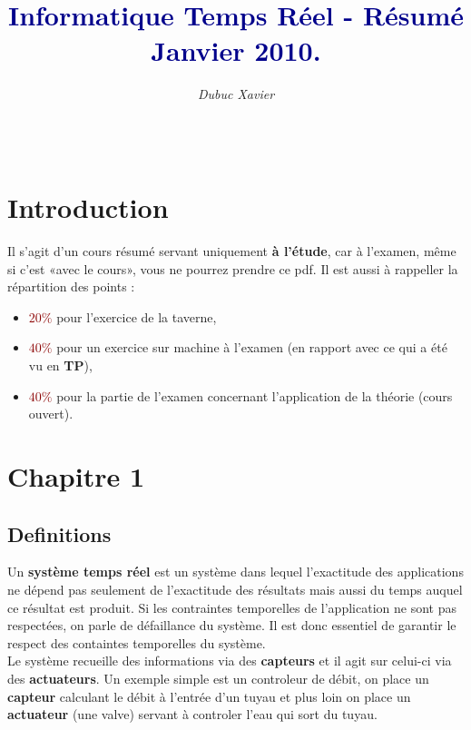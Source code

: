 \documentclass{article}
\title{\textbf{\textcolor{darkblue}{Informatique Temps Réel - Résumé Janvier 2010.}}}
\author{\textit{Dubuc Xavier}}
\newcommand{\dred}[1]{\textcolor{darkred}{\textbf{#1}}}
\begin{document}
\maketitle

\hbox{\raisebox{0.4em}{\vrule depth 0.4pt height 0.4pt width 10cm}}

\tableofcontents

$ $ \\
\hbox{\raisebox{0.4em}{\vrule depth 0.4pt height 0.4pt width 10cm}}

\newpage

\section*{Introduction}

Il s'agit d'un cours résumé servant uniquement \textbf{à l'étude}, car à l'examen, même si c'est «avec le 
cours», vous ne pourrez prendre ce pdf. Il est aussi à rappeller la répartition des points : \\
\begin{itemize}
\item \dred{$20\%$} pour l'exercice de la taverne,
\item \dred{$40\%$} pour un exercice sur machine à l'examen (en rapport avec ce qui a été vu en 
\textbf{TP}),
\item \dred{$40\%$} pour la partie de l'examen concernant l'application de la théorie (cours ouvert).
\end{itemize}

\section{Chapitre 1}

\subsection{Definitions}

Un \textbf{système temps réel} est un système dans lequel l'exactitude des applications ne dépend pas 
seulement de l'exactitude des résultats mais aussi du temps auquel ce résultat est produit. Si les 
contraintes temporelles de l'application ne sont pas respectées, on parle de défaillance du système. Il est 
donc essentiel de garantir le respect des containtes temporelles du système. \\

Le système recueille des informations via des \textbf{capteurs} et il agit sur celui-ci via des 
\textbf{actuateurs}. Un exemple simple est un controleur de débit, on place un \textbf{capteur} calculant
le débit à l'entrée d'un tuyau et plus loin on place un \textbf{actuateur} (une valve) servant à controler
l'eau qui sort du tuyau. \\
\end{document}
